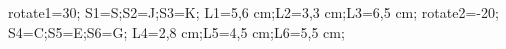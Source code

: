 \documentclass[exercice]{thedocument}%
\begin{document}
%
    \>rotate1=30;%
    \>S1=S;\>S2=J;\>S3=K;%
    \>L1=5,6 cm;\>L2=3,3 cm;\>L3=6,5 cm;%
    \>rotate2=-20;%
    \>S4=C;\>S5=E;\>S6=G;%
    \>L4=2,8 cm;\>L5=4,5 cm;\>L6=5,5 cm;%
\end{document}
